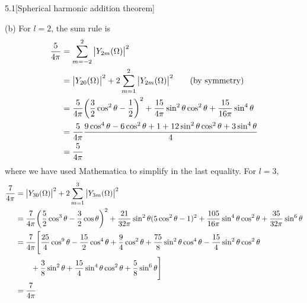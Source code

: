 \documentclass[12pt]{article}
\begin{document}
\begin{problem}{5.1}[Spherical harmonic addition theorem]
\begin{solution}
(b) For $l=2$, the sum rule is
\begin{align}
    \frac{5}{4\pi}
    &=\sum_{m=-2}^2\abs{Y_{2m}(\Omega)}^2\notag\\
    &=\abs{Y_{20}(\Omega)}^2+2\sum_{m=1}^2\abs{Y_{2m}(\Omega)}^2
        \tag{by symmetry}\\
    &=\frac5{4\pi}\qty(\frac32\cos^2\theta-\frac12)^2
    +\frac{15}{4\pi}\sin^2\theta\cos^2\theta+\frac{15}{16\pi}\sin^4\theta\notag\\
    &=\frac{5}{4\pi}\frac{9\cos^4\theta-6\cos^2\theta+1+12\sin^2\theta\cos^2\theta+3\sin^4\theta}{4}\notag\\
    &=\frac{5}{4\pi}
\end{align}
where we have used Mathematica to simplify in the last equality. For $l=3$,
\begin{align}
    \frac{7}{4\pi}
    &=\abs{Y_{30}(\Omega)}^2+2\sum_{m=1}^3\abs{Y_{3m}(\Omega)}^2\notag\\
    &=\frac{7}{4\pi}\qty(\frac52\cos^3\theta-\frac32\cos\theta)^2
    +\frac{21}{32\pi}\sin^2\theta(5\cos^2\theta-1)^2
    +\frac{105}{16\pi}\sin^4\theta\cos^2\theta+\frac{35}{32\pi}\sin^6\theta\notag\\
    &=\frac{7}{4\pi}\Bigg[\frac{25}{4}\cos^9\theta
        -\frac{15}{2}\cos^4\theta+\frac94\cos^2\theta+\frac{75}{8}\sin^2\theta\cos^4\theta-\frac{15}{4}\sin^2\theta\cos^2\theta\notag\\
    &\qquad+\frac38\sin^2\theta+\frac{15}{4}\sin^4\theta\cos^2\theta+\frac58\sin^6\theta\Bigg]\notag\\
    &=\frac{7}{4\pi}
\end{align}
\end{solution}
\end{problem}
\end{document}
